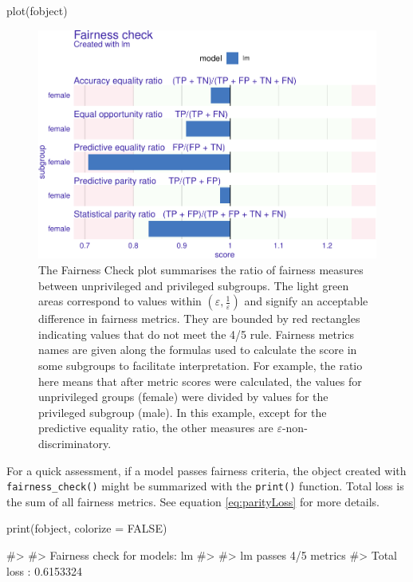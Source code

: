 \begin{Schunk}
\begin{Sinput}
plot(fobject)
\end{Sinput}
\begin{figure}

{\centering \includegraphics[width=0.75\linewidth]{RJ-2022-019_files/figure-latex/fairness-plot-1-1} 

}

\caption[The Fairness Check plot summarises the ratio of fairness measures between unprivileged and privileged subgroups]{The Fairness Check plot summarises the ratio of fairness measures between unprivileged and privileged subgroups. The light green areas correspond to values within $(\varepsilon, \frac{1}{\varepsilon})$ and signify an acceptable difference in fairness metrics. They are bounded by red rectangles indicating values that do not meet the 4/5 rule. Fairness metrics names are given along the formulas used to calculate the score in some subgroups to facilitate interpretation. For example, the ratio here means that after metric scores were calculated, the values for unprivileged groups (female) were divided by values for the privileged subgroup (male). In this example, except for the predictive equality ratio, the other measures are $\varepsilon$-non-discriminatory. }\label{fig:fairness-plot-1}
\end{figure}
\end{Schunk}

For a quick assessment, if a model passes fairness criteria, the object
created with \texttt{fairness\_check()} might be summarized with the
\texttt{print()} function. Total loss is the sum of all fairness
metrics. See equation \eqref{eq:parityLoss} for more details.

\begin{Schunk}
\begin{Sinput}
print(fobject, colorize = FALSE)
\end{Sinput}
\begin{Soutput}
#> 
#> Fairness check for models: lm 
#> 
#> lm passes 4/5 metrics
#> Total loss :  0.6153324
\end{Soutput}
\end{Schunk}

